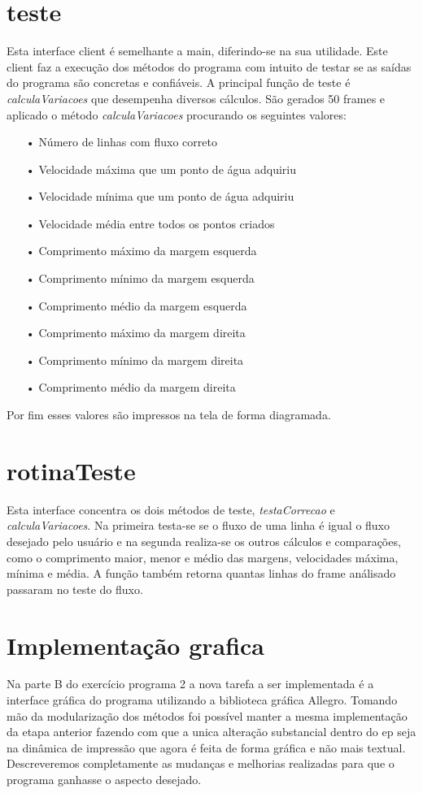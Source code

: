 \documentclass[a4paper,11pt]{article}
\begin{document}
\section{teste}
Esta interface client é semelhante a main, diferindo-se na sua utilidade. Este client faz a execu\c{c}ão dos métodos do programa com intuito de testar se as saídas do programa são concretas e confiáveis. A principal fun\c{c}ão de teste é \textit{calculaVariacoes} que desempenha diversos cálculos. São gerados 50 frames e aplicado o método \textit{calculaVariacoes} procurando os seguintes valores:
\begin{enumerate}
\item[•]{Número de linhas com fluxo correto}
\item[•]{Velocidade máxima que um ponto de água adquiriu}
\item[•]{Velocidade mínima que um ponto de água adquiriu}
\item[•]{Velocidade média entre todos os pontos criados}
\item[•]{Comprimento máximo da margem esquerda}
\item[•]{Comprimento mínimo da margem esquerda}
\item[•]{Comprimento médio da margem esquerda}
\item[•]{Comprimento máximo da margem direita}
\item[•]{Comprimento mínimo da margem direita}
\item[•]{Comprimento médio da margem direita}
\end{enumerate}
Por fim esses valores são impressos na tela de forma diagramada.

\section{rotinaTeste}
Esta interface concentra os dois métodos de teste, \textit{testaCorrecao} e \textit{calculaVariacoes}. Na primeira testa-se se o fluxo de uma linha é igual o fluxo desejado pelo usuário e na segunda realiza-se os outros cálculos e compara\c{c}ões, como o comprimento maior, menor e médio das margens, velocidades máxima, mínima e média. A fun\c{c}ão também retorna quantas linhas do frame análisado passaram no teste do fluxo.

\section{Implementa\c{c}ão grafica}
Na parte B do exercício programa 2 a nova tarefa a ser implementada é a interface gráfica do programa utilizando a biblioteca gráfica Allegro. Tomando mão da modularização dos métodos foi possível manter a mesma implementação da etapa anterior fazendo com que a unica alteração substancial dentro do ep seja na dinâmica de impressão que agora é feita de forma gráfica e não mais textual. Descreveremos completamente as mudanças e melhorias realizadas para que o programa ganhasse o aspecto desejado.
\end{document}
